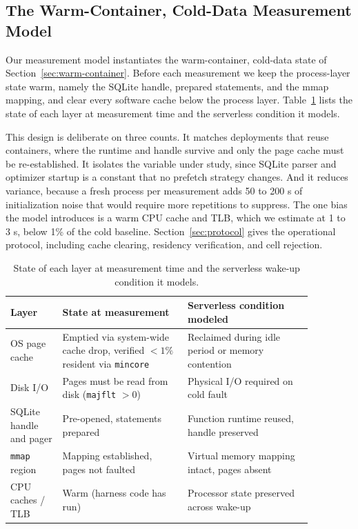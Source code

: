 \documentclass[sigconf, nonacm]{acmart}
\begin{document}
\subsection{The Warm-Container, Cold-Data Measurement Model}\label{sec:measurement-model}

Our measurement model instantiates the warm-container, cold-data state of Section~\ref{sec:warm-container}. Before each measurement we keep the process-layer state warm, namely the SQLite handle, prepared statements, and the mmap mapping, and clear every software cache below the process layer. Table~\ref{tab:measurement-model} lists the state of each layer at measurement time and the serverless condition it models.

This design is deliberate on three counts. It matches deployments that reuse containers, where the runtime and handle survive and only the page cache must be re-established. It isolates the variable under study, since SQLite parser and optimizer startup is a constant that no prefetch strategy changes. And it reduces variance, because a fresh process per measurement adds 50 to 200 \textmu s of initialization noise that would require more repetitions to suppress. The one bias the model introduces is a warm CPU cache and TLB, which we estimate at 1 to 3 \textmu s, below 1\% of the cold baseline. Section~\ref{sec:protocol} gives the operational protocol, including cache clearing, residency verification, and cell rejection.

\begin{table}[htbp]
\centering
\caption{State of each layer at measurement time and the serverless wake-up condition it models.}
\label{tab:measurement-model}
\begin{tabular}{p{0.15\linewidth}p{0.36\linewidth}p{0.36\linewidth}}
\toprule
\textbf{Layer} & \textbf{State at measurement} & \textbf{Serverless condition modeled} \\
\midrule
OS page cache & Emptied via system-wide cache drop, verified $<1\%$ resident via \texttt{mincore} & Reclaimed during idle period or memory contention \\
Disk I/O & Pages must be read from disk (\texttt{majflt} $>0$) & Physical I/O required on cold fault \\
SQLite handle and pager & Pre-opened, statements prepared & Function runtime reused, handle preserved \\
\texttt{mmap} region & Mapping established, pages not faulted & Virtual memory mapping intact, pages absent \\
CPU caches / TLB & Warm (harness code has run) & Processor state preserved across wake-up \\
\bottomrule
\end{tabular}
\end{table}
\end{document}
